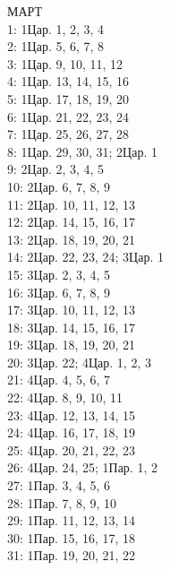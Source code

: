 \documentclass[fontsize=16pt,letterpaper,DIV=6]{scrartcl}
\begin{document}
\begin{multicols}{2}
МАРТ
\\  1: 1Цар. 1, 2, 3, 4
\\  2: 1Цар. 5, 6, 7, 8
\\  3: 1Цар. 9, 10, 11, 12
\\  4: 1Цар. 13, 14, 15, 16
\\  5: 1Цар. 17, 18, 19, 20
\\  6: 1Цар. 21, 22, 23, 24
\\  7: 1Цар. 25, 26, 27, 28
\\  8: 1Цар. 29, 30, 31; 2Цар. 1
\\  9: 2Цар. 2, 3, 4, 5
\\  10: 2Цар. 6, 7, 8, 9
\\  11: 2Цар. 10, 11, 12, 13
\\  12: 2Цар. 14, 15, 16, 17
\\  13: 2Цар. 18, 19, 20, 21
\\  14: 2Цар. 22, 23, 24; 3Цар. 1
\\  15: 3Цар. 2, 3, 4, 5
\\  16: 3Цар. 6, 7, 8, 9
\\  17: 3Цар. 10, 11, 12, 13
\\  18: 3Цар. 14, 15, 16, 17
\\  19: 3Цар. 18, 19, 20, 21
\\  20: 3Цар. 22; 4Цар. 1, 2, 3
\\  21: 4Цар. 4, 5, 6, 7
\\  22: 4Цар. 8, 9, 10, 11
\\  23: 4Цар. 12, 13, 14, 15
\\  24: 4Цар. 16, 17, 18, 19
\\  25: 4Цар. 20, 21, 22, 23
\\  26: 4Цар. 24, 25; 1Пар. 1, 2
\\  27: 1Пар. 3, 4, 5, 6
\\  28: 1Пар. 7, 8, 9, 10
\\  29: 1Пар. 11, 12, 13, 14
\\  30: 1Пар. 15, 16, 17, 18
\\  31: 1Пар. 19, 20, 21, 22


\end{multicols}
\end{document}
